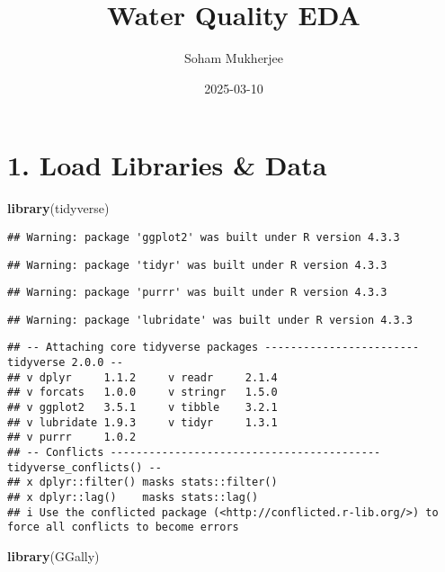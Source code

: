 \documentclass[
]{article}
\title{Water Quality EDA}
\author{Soham Mukherjee}
\date{2025-03-10}
\newenvironment{Shaded}{\begin{snugshade}}{\end{snugshade}}
\newcommand{\FunctionTok}[1]{\textcolor[rgb]{0.13,0.29,0.53}{\textbf{#1}}}
\newcommand{\NormalTok}[1]{#1}
\begin{document}
\maketitle

\hypertarget{load-libraries-data}{%
\section{\texorpdfstring{\textbf{1. Load Libraries \&
Data}}{1. Load Libraries \& Data}}\label{load-libraries-data}}

\begin{Shaded}
\begin{Highlighting}[]
\FunctionTok{library}\NormalTok{(tidyverse)}
\end{Highlighting}
\end{Shaded}

\begin{verbatim}
## Warning: package 'ggplot2' was built under R version 4.3.3
\end{verbatim}

\begin{verbatim}
## Warning: package 'tidyr' was built under R version 4.3.3
\end{verbatim}

\begin{verbatim}
## Warning: package 'purrr' was built under R version 4.3.3
\end{verbatim}

\begin{verbatim}
## Warning: package 'lubridate' was built under R version 4.3.3
\end{verbatim}

\begin{verbatim}
## -- Attaching core tidyverse packages ------------------------ tidyverse 2.0.0 --
## v dplyr     1.1.2     v readr     2.1.4
## v forcats   1.0.0     v stringr   1.5.0
## v ggplot2   3.5.1     v tibble    3.2.1
## v lubridate 1.9.3     v tidyr     1.3.1
## v purrr     1.0.2     
## -- Conflicts ------------------------------------------ tidyverse_conflicts() --
## x dplyr::filter() masks stats::filter()
## x dplyr::lag()    masks stats::lag()
## i Use the conflicted package (<http://conflicted.r-lib.org/>) to force all conflicts to become errors
\end{verbatim}

\begin{Shaded}
\begin{Highlighting}[]
\FunctionTok{library}\NormalTok{(GGally)}
\end{Highlighting}
\end{Shaded}
\end{document}
